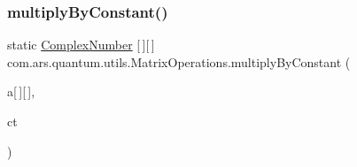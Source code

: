 \subsubsection{\texorpdfstring{multiply\+By\+Constant()}{multiplyByConstant()}}
{\footnotesize\ttfamily static \hyperlink{classcom_1_1ars_1_1complexnumbers_1_1_complex_number}{Complex\+Number} \mbox{[}$\,$\mbox{]}\mbox{[}$\,$\mbox{]} com.\+ars.\+quantum.\+utils.\+Matrix\+Operations.\+multiply\+By\+Constant (\begin{DoxyParamCaption}\item[{\hyperlink{classcom_1_1ars_1_1complexnumbers_1_1_complex_number}{Complex\+Number}}]{a\mbox{[}$\,$\mbox{]}\mbox{[}$\,$\mbox{]},  }\item[{double}]{ct }\end{DoxyParamCaption})\hspace{0.3cm}{\ttfamily [static]}}

